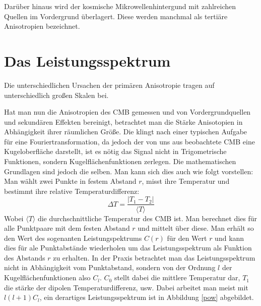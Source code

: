 \documentclass[10pt,a4paper]{article}
\begin{document}
Darüber hinaus wird der kosmische Mikrowellenhintergund mit zahlreichen Quellen im Vordergrund überlagert. Diese werden manchmal als tertiäre Anisotropien bezeichnet.

\section{Das Leistungsspektrum}
Die unterschiedlichen Ursachen der primären Anisotropie tragen auf unterschiedlich großen Skalen bei.

Hat man nun die Anisotropien des CMB gemessen und von Vordergrundquellen und sekundären Effekten bereinigt, betrachtet man die Stärke Anisotopien in Abhängigkeit ihrer räumlichen Größe.
Die klingt nach einer typischen Aufgabe für eine Fouriertransformation, da jedoch der von uns aus beobachtete CMB eine Kugeloberfläche darstellt, ist es nötig das Signal nicht in Trigometrische Funktionen, sondern Kugelflächenfunktionen zerlegen. Die mathematischen Grundlagen sind jedoch die selben. 
Man kann sich dies auch wie folgt vorstellen:
Man wählt zwei Punkte in festem Abstand $r$, misst ihre Temperatur und bestimmt ihre relative Temperaturdifferenz:
\begin{equation}
\Delta T = \frac{|T_1-T_2|}{\langle T\rangle }
\end{equation}
Wobei $\langle T\rangle$ die durchschnittliche Temperatur des CMB ist. Man berechnet dies für alle Punktpaare mit dem festen Abstand $r$ und mittelt über diese. Man erhält so den Wert des sogenanten Leistungspektrums $C(r)$ für den Wert $r$ und kann dies für ale Punktabstände wiederholen um das Leistungsspektrum als Funktion des Abstands $r$ zu erhalten. In der Praxis betrachtet man das Leistungsspektrum nicht in Abhängigkeit vom Punktabstand, sondern von der Ordnung $l$ der Kugelflächenfunktionen also $C_l$. $C_0$ stellt dabei die mittlere Temperatur dar, $T_1$ die stärke der dipolen Temperaturdifferenz, usw.
Dabei arbeitet man meist mit $l\left(l+1\right)C_l$, ein derartiges Leistungsspektrum ist in Abbildung \ref{pow} abgebildet.
\end{document}
